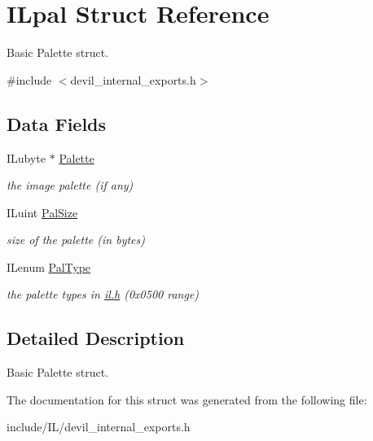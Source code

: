 \hypertarget{struct_i_lpal}{\section{I\-Lpal Struct Reference}
\label{struct_i_lpal}
}


Basic Palette struct.  




{\ttfamily \#include $<$devil\-\_\-internal\-\_\-exports.\-h$>$}

\subsection*{Data Fields}
\begin{DoxyCompactItemize}
\item 
\hypertarget{struct_i_lpal_ab520cff305ed9ee13d2eac7a87ac1d92}{I\-Lubyte $\ast$ \hyperlink{struct_i_lpal_ab520cff305ed9ee13d2eac7a87ac1d92}{Palette}}\label{struct_i_lpal_ab520cff305ed9ee13d2eac7a87ac1d92}

\begin{DoxyCompactList}\small\item\em the image palette (if any) \end{DoxyCompactList}\item 
\hypertarget{struct_i_lpal_a728a63d4c8b857a800a4d19e250a8c4b}{I\-Luint \hyperlink{struct_i_lpal_a728a63d4c8b857a800a4d19e250a8c4b}{Pal\-Size}}\label{struct_i_lpal_a728a63d4c8b857a800a4d19e250a8c4b}

\begin{DoxyCompactList}\small\item\em size of the palette (in bytes) \end{DoxyCompactList}\item 
\hypertarget{struct_i_lpal_ab091aab8d79003031a4e9957e85f43ca}{I\-Lenum \hyperlink{struct_i_lpal_ab091aab8d79003031a4e9957e85f43ca}{Pal\-Type}}\label{struct_i_lpal_ab091aab8d79003031a4e9957e85f43ca}

\begin{DoxyCompactList}\small\item\em the palette types in \hyperlink{il_8h}{il.\-h} (0x0500 range) \end{DoxyCompactList}\end{DoxyCompactItemize}


\subsection{Detailed Description}
Basic Palette struct. 

The documentation for this struct was generated from the following file\-:\begin{DoxyCompactItemize}
\item 
include/\-I\-L/devil\-\_\-internal\-\_\-exports.\-h\end{DoxyCompactItemize}
